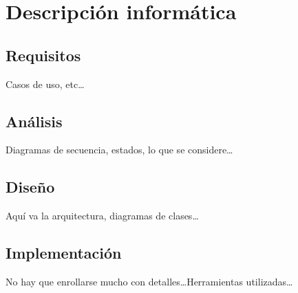 \chapter{Descripción informática}

\section{Requisitos}

Casos de uso, etc\dots

\section{Análisis}

Diagramas de secuencia, estados, lo que se considere\dots

\section{Diseño}

Aquí va la arquitectura, diagramas de clases\dots

\section{Implementación}

No hay que enrollarse mucho con detalles\dots Herramientas utilizadas\dots